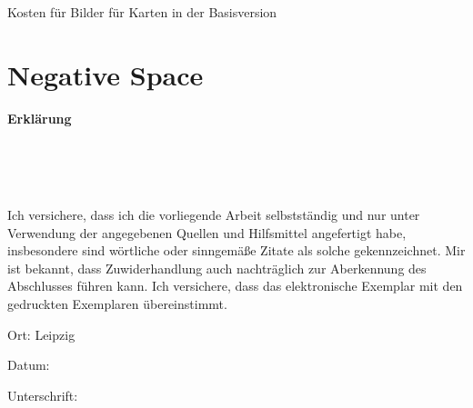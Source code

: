 \documentclass[fontsize=12, a4aper]{scrartcl}
\newcommand\textbox[1]
{
	\parbox{.333\textwidth}{#1}
}
\begin{document}
Kosten für Bilder für Karten in der Basisversion

\section{Negative Space} \label{sec:Negativ_Space}




\newpage

\listoftables

\listoffigures

\newpage

\appendix




\newpage

\begin{center}
	
	\fontsize{14pt}{12pt}
	
	\textbf{Erklärung}\\
	
\end{center}

\begin{verbatim}
	
	
	
\end{verbatim}

\noindent Ich versichere, dass ich die vorliegende Arbeit selbstständig und nur unter Verwendung der
angegebenen Quellen und Hilfsmittel angefertigt habe, insbesondere sind wörtliche oder
sinngemäße Zitate als solche gekennzeichnet. Mir ist bekannt, dass Zuwiderhandlung auch
nachträglich zur Aberkennung des Abschlusses führen kann.
Ich versichere, dass das elektronische Exemplar mit den gedruckten Exemplaren übereinstimmt.

\bigskip

\noindent\textbox{Ort: Leipzig\hfill}\textbox{\hfil Datum:\hfil}\textbox{\hfill Unterschrift:}
\end{document}
